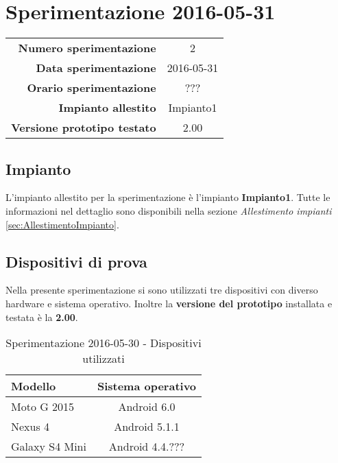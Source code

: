 \documentclass[../Sperimentazione.tex]{subfiles}
\begin{document}
	\section{Sperimentazione 2016-05-31}
	
		\begin{table} [h]
		\centering
		\begin{tabular}[width=0.5\textwidth]{r|c}
			\textbf{Numero sperimentazione} & 2 \\
			\textbf{Data sperimentazione} & 2016-05-31 \\
			\textbf{Orario sperimentazione} & ??? \\
			\textbf{Impianto allestito} & Impianto1 \\
			\textbf{Versione prototipo testato} & 2.00 \\		
		\end{tabular}
		\end{table}
		
		
		\subsection{Impianto}
		L'impianto allestito per la sperimentazione è l'impianto \textbf{Impianto1}. Tutte le informazioni nel dettaglio sono disponibili nella sezione \textit{Allestimento impianti} \ref{sec:AllestimentoImpianto}.


		\subsection{Dispositivi di prova}
			Nella presente sperimentazione si sono utilizzati tre dispositivi con diverso hardware e sistema operativo. Inoltre la \textbf{versione del prototipo} installata e testata è la \textbf{2.00}.
	
			\begin{table} [h]
			\centering
				\begin{tabular}{lc}
					\textbf{Modello} & \textbf{Sistema operativo} \\
					\toprule
					 Moto G 2015 & Android 6.0 \\
					 \midrule
					 Nexus 4 & Android 5.1.1 \\
					 \midrule
					 Galaxy S4 Mini & Android 4.4.??? \\
					\bottomrule
				\end{tabular}
				\caption{Sperimentazione 2016-05-30 - Dispositivi utilizzati}
				\label{tab:Sperimentazione1Dispositivi}
			\end{table}
		
\end{document}

